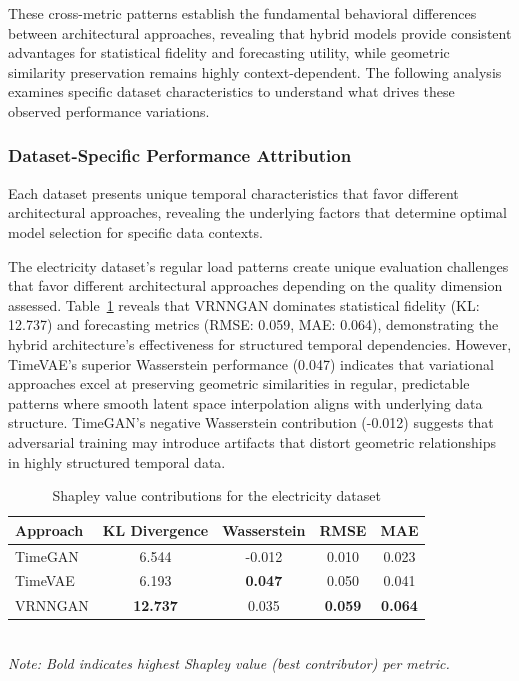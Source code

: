 \documentclass[11pt]{article}
\begin{document}
These cross-metric patterns establish the fundamental behavioral differences between architectural approaches, revealing that hybrid models provide consistent advantages for statistical fidelity and forecasting utility, while geometric similarity preservation remains highly context-dependent. The following analysis examines specific dataset characteristics to understand what drives these observed performance variations.

\subsubsection{Dataset-Specific Performance Attribution}

Each dataset presents unique temporal characteristics that favor different architectural approaches, revealing the underlying factors that determine optimal model selection for specific data contexts.

The electricity dataset's regular load patterns create unique evaluation challenges that favor different architectural approaches depending on the quality dimension assessed. Table~\ref{tab:shapley_electricity} reveals that VRNNGAN dominates statistical fidelity (KL: 12.737) and forecasting metrics (RMSE: 0.059, MAE: 0.064), demonstrating the hybrid architecture's effectiveness for structured temporal dependencies. However, TimeVAE's superior Wasserstein performance (0.047) indicates that variational approaches excel at preserving geometric similarities in regular, predictable patterns where smooth latent space interpolation aligns with underlying data structure. TimeGAN's negative Wasserstein contribution (-0.012) suggests that adversarial training may introduce artifacts that distort geometric relationships in highly structured temporal data.


\begin{table}[H]
\centering
\caption{Shapley value contributions for the electricity dataset}
\label{tab:shapley_electricity}
\begin{tabular}{lcccc}
\toprule
\textbf{Approach} & \textbf{KL Divergence} & \textbf{Wasserstein} & \textbf{RMSE} & \textbf{MAE} \\
\midrule
TimeGAN & 6.544 & -0.012 & 0.010 & 0.023 \\
TimeVAE & 6.193 & \textbf{0.047} & 0.050 & 0.041 \\
VRNNGAN & \textbf{12.737} & 0.035 & \textbf{0.059} & \textbf{0.064} \\
\bottomrule
\end{tabular}
\\[0.5em]
\footnotesize
\textit{Note: Bold indicates highest Shapley value (best contributor) per metric.}
\end{table}
\end{document}
